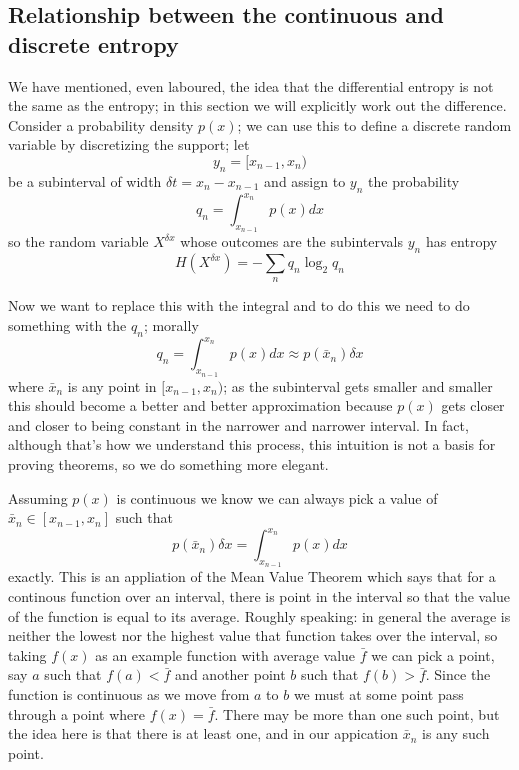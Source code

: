 \documentclass[12pt]{article}
\begin{document}
\subsection*{Relationship between the continuous and discrete entropy}

We have mentioned, even laboured, the idea that the differential
entropy is not the same as the entropy; in this section we will
explicitly work out the difference. Consider a probability density
$p(x)$; we can use this to define a discrete random variable by discretizing the support; let
\begin{equation}
  y_n=[x_{n-1},x_n)
\end{equation}
be a subinterval of width $\delta t=x_n-x_{n-1}$ and assign to $y_n$ the probability
\begin{equation}
  q_n=\int_{x_{n-1}}^{x_n}p(x)dx
\end{equation}
so the random variable $X^{\delta x}$ whose outcomes are the subintervals $y_n$ has entropy
\begin{equation}
  H(X^{\delta x})=-\sum_n q_n \log_2{q_n}
\end{equation}

Now we want to replace this with the integral and to do this we need to do something with the $q_n$; morally
\begin{equation}\label{HY}
  q_n=\int_{x_{n-1}}^{x_n}p(x)dx\approx p(\bar{x}_n)\delta x
\end{equation}
where $\bar{x}_n$ is any point in $[x_{n-1},x_n)$; as the subinterval
  gets smaller and smaller this should become a better and better
  approximation because $p(x)$ gets closer and closer to being
  constant in the narrower and narrower interval. In fact, although
  that's how we understand this process, this intuition is not a basis
  for proving theorems, so we do something more elegant.

Assuming $p(x)$ is continuous we know we can
always pick a value of $\bar{x}_n\in[x_{n-1},x_n]$ such that
\begin{equation}
  p(\bar{x}_n)\delta x=\int_{x_{n-1}}^{x_n}p(x)dx
  \end{equation}
exactly. This is an appliation of the Mean Value Theorem which says
that for a continous function over an interval, there is point in the
interval so that the value of the function is equal to its
average. Roughly speaking: in general the average is neither the
lowest nor the highest value that function takes over the interval, so
taking $f(x)$ as an example function with average value $\bar{f}$ we
can pick a point, say $a$ such that $f(a)<\bar{f}$ and another point
$b$ such that $f(b)>\bar{f}$. Since the function is continuous as we
move from $a$ to $b$ we must at some point pass through a point where
$f(x)=\bar{f}$. There may be more than one such point, but the idea
here is that there is at least one, and in our appication $\bar{x}_n$
is any such point.
\end{document}
